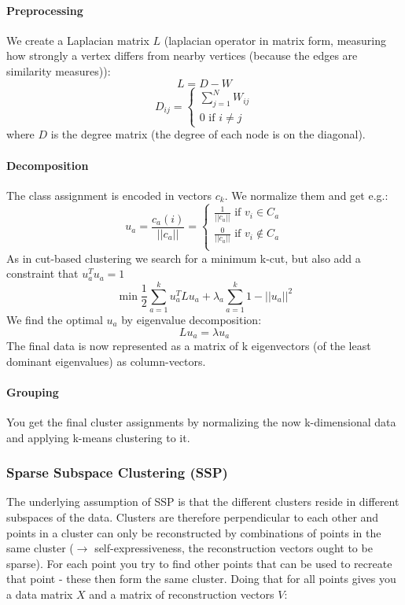 \documentclass[../main.tex]{subfiles}
\begin{document}
\paragraph{Preprocessing} We create a Laplacian matrix $L$ (laplacian operator in matrix form, measuring how strongly a vertex differs from nearby vertices (because the edges are similarity measures)): %
    $$L = D - W$$  
    \[ D_{ij} = \begin{cases}
        \sum_{j=1}^N W_{ij} \\ 
        0 \text{ if } i \neq j
    \end{cases} \]
    where $D$ is the degree matrix (the degree of each node is on the diagonal). 
\paragraph{Decomposition} The class assignment is encoded in vectors $c_k$. We normalize them and get e.g.: 
    \[ u_a = \frac{c_a(i)}{||c_a||}  = \begin{cases}
            \frac{1}{||c_a||} \text{ if } v_i \in C_a \\
            \frac{0}{||c_a||} \text{ if } v_i \notin C_a \\
        \end{cases}\]
    As in cut-based clustering we search for a minimum k-cut, but also add a constraint that $u_a^T u_a = 1$ 
    $$
    \min \frac{1}{2} \sum_{a=1}^k u_a^T L u_a + \lambda_a \sum_{a=1}^k 1-||u_a||^2
    $$
    We find the optimal $u_a$ by eigenvalue decomposition:
    $$
    L u_a = \lambda u_a
    $$
    The final data is now represented as a matrix of k eigenvectors (of the least dominant eigenvalues) as column-vectors. 
    
\paragraph{Grouping} You get the final cluster assignments by normalizing the now k-dimensional data and applying k-means clustering to it. 

\subsubsection{Sparse Subspace Clustering (SSP)} \label{SSP}
The underlying assumption of SSP is that the different clusters reside in different subspaces of the data. Clusters are therefore perpendicular to each other and points in a cluster can only be reconstructed by combinations of points in the same cluster ($\rightarrow$ self-expressiveness, the reconstruction vectors ought to be sparse). For each point you try to find other points that can be used to recreate that point - these then form the same cluster. Doing that for all points gives you a data matrix $X$ and a matrix of reconstruction vectors $V$:
\end{document}
